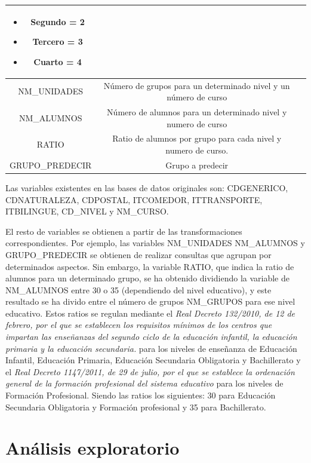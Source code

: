 \begin{subappendices}
\begin{table}[!ht]
{\begin{tabular}{|c|c|c|}
\begin{minipage}[t]{0.4\textwidth}
\begin{itemize}
					\item Segundo = 2
					\item Tercero = 3
					\item Cuarto = 4
				\end{itemize}
			\end{minipage}\\ 
			\hline 
			NM\_UNIDADES & Número de grupos para un determinado nivel y un número de curso &  \\ 
			\hline 
			NM\_ALUMNOS & Número de alumnos para un determinado nivel y numero de curso &  \\ 
			\hline 
			RATIO & Ratio de alumnos por grupo para cada nivel y numero de curso. &  \\ 
			\hline 
			GRUPO\_PREDECIR & Grupo a predecir  &  \\ 
			\hline 
	\end{tabular}}
	
	\label{tab:TablaVariables}
\end{table}

Las variables existentes en las bases de datos originales son: CDGENERICO, CDNATURALEZA, CDPOSTAL, ITCOMEDOR, ITTRANSPORTE, ITBILINGUE, CD\_NIVEL y NM\_CURSO.

El resto de variables se obtienen a partir de las transformaciones correspondientes. Por ejemplo, las variables NM\_UNIDADES NM\_ALUMNOS y GRUPO\_PREDECIR se obtienen de realizar consultas que agrupan por determinados aspectos. Sin embargo, la variable RATIO, que indica la ratio de alumnos para un determinado grupo, se ha obtenido dividiendo la variable de NM\_ALUMNOS entre 30 o 35 (dependiendo del nivel educativo), y este resultado se ha divido entre el número de grupos NM\_GRUPOS para ese nivel educativo. Estos ratios se regulan mediante el \textit{Real Decreto 132/2010, de 12 de febrero, por el que se establecen los requisitos mínimos de los centros que impartan las enseñanzas del segundo ciclo de la educación infantil, la educación primaria y la educación secundaria.} para los niveles de enseñanza de Educación Infantil, Educación Primaria, Educación Secundaria Obligatoria y Bachillerato y el \textit{Real Decreto 1147/2011, de 29 de julio, por el que se establece la ordenación general de la formación profesional del sistema educativo} para los niveles de Formación Profesional. Siendo las ratios los siguientes: 30 para Educación Secundaria Obligatoria y Formación profesional y 35 para Bachillerato.

\section{Análisis exploratorio}

\end{subappendices}
